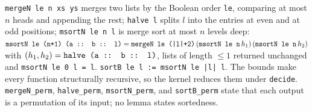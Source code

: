 \begin{definition}[Sorting]\label{def:lean-pathsum-sort}
\textnormal{\texttt{mergeN le n xs ys}} merges two lists by the Boolean order \textnormal{\texttt{le}}, comparing at most $n$
heads and appending the rest; \textnormal{\texttt{halve l}} splits $l$ into the entries at even and at odd
positions; \textnormal{\texttt{msortN le n l}} is merge sort at most $n$ levels deep:
$\textnormal{\texttt{msortN le (\allowbreak{}n+1) (\allowbreak{}a :: b :: l)}} = \textnormal{\texttt{mergeN le (\allowbreak{}|l|+2)}}\,(\textnormal{\texttt{msortN le n}}\,h_1)\,(\textnormal{\texttt{msortN le n}}\,h_2)$
with $(h_1,h_2)=\textnormal{\texttt{halve (\allowbreak{}a :: b :: l)}}$, lists of length $\le1$ returned unchanged and
\textnormal{\texttt{msortN le 0 l = l}}. \textnormal{\texttt{sortB le l := msortN le |l| l}}. The bounds make every function
structurally recursive, so the kernel reduces them under \textnormal{\texttt{decide}}. \textnormal{\texttt{mergeN\_\allowbreak{}perm}},
\textnormal{\texttt{halve\_\allowbreak{}perm}}, \textnormal{\texttt{msortN\_\allowbreak{}perm}}, and \textnormal{\texttt{sortB\_\allowbreak{}perm}} state that each output is a
permutation of its input; no lemma states sortedness.
\end{definition}

